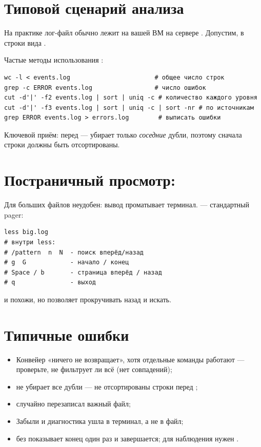 \section{Типовой сценарий анализа}

\begin{sloppypar}
На практике лог-файл обычно лежит на вашей ВМ на сервере
. Допустим, в  строки вида
.
\end{sloppypar}
Частые методы использования :
\begin{verbatim}
wc -l < events.log                       # общее число строк
grep -c ERROR events.log                 # число ошибок
cut -d'|' -f2 events.log | sort | uniq -c # количество каждого уровня
cut -d'|' -f3 events.log | sort | uniq -c | sort -nr # по источникам
grep ERROR events.log > errors.log        # выписать ошибки
\end{verbatim}

Ключевой приём:  перед  ---
 убирает только \emph{соседние} дубли, поэтому
сначала строки должны быть отсортированы.

\section{Постраничный просмотр: }

Для больших файлов  неудобен: вывод проматывает
терминал.  --- стандартный pager:
\begin{verbatim}
less big.log
# внутри less:
# /pattern  n  N  - поиск вперёд/назад
# g  G            - начало / конец
# Space / b       - страница вперёд / назад
# q               - выход
\end{verbatim}

 и  похожи, но  позволяет
прокручивать назад и искать.

\section{Типичные ошибки}
\begin{itemize}
  \item Конвейер «ничего не возвращает», хотя отдельные
    команды работают --- проверьте, не фильтрует ли
     всё (нет совпадений);
  \item {} не убирает все дубли --- не отсортированы
    строки перед ;
  \item \cmd{>} случайно перезаписал важный файл;
  \item Забыли  и диагностика ушла в терминал,
    а не в файл;
  \item {} без  показывает конец один раз
    и завершается; для наблюдения нужен .
\end{itemize}

